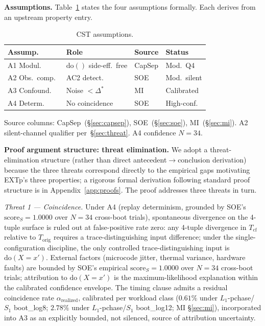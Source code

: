 \documentclass[conference]{IEEEtran}
\newcommand{\Korig}{T_\text{orig}}
\newcommand{\Tcf}{T_\text{cf}}
\newcommand{\Dstar}{\Delta^{*}}
\newcommand{\arealized}{\alpha_\text{realized}}
\newcommand{\scoreS}{\text{score}_S}
\newcommand{\dox}[1]{\text{do}(X{=}#1)}
\begin{document}
\textbf{Assumptions.} Table~\ref{tab:assumptions} states the four
assumptions formally. Each derives from an upstream property entry.

\begin{table}[t]
  \caption{CST assumptions.}
  \label{tab:assumptions}
  \centering
  \small
  \begin{tabular}{@{}p{}p{}p{}p{}@{}}
  \toprule
  Assump.\ & Role & Source & Status \\
  \midrule
  A1 Modul.\           & $\text{do}()$ side-eff.\ free & CapSep
                       & Mod.\ Q4 \\
  A2 Obs.\ comp.\      & AC2 detect.                   & SOE
                       & Mod.\ silent \\
  A3 Confound.\        & Noise $<\Dstar$               & MI
                       & Calibrated \\
  A4 Determ.\          & No coincidence                & SOE
                       & High-conf. \\
  \bottomrule
  \end{tabular}

  \vspace{0.3em}
  \footnotesize{Source columns: CapSep~(\S\ref{sec:capsep}),
  SOE~(\S\ref{sec:soe}), MI~(\S\ref{sec:mi}). A2 silent-channel
  qualifier per~\S\ref{sec:threat}. A4 confidence $N{=}34$.}
\end{table}

\textbf{Proof argument structure: threat elimination.} We adopt a
threat-elimination structure (rather than direct
antecedent$\rightarrow$conclusion derivation) because the three
threats correspond directly to the empirical gaps motivating EXTp's
three properties; a rigorous formal derivation following standard
proof structure is in Appendix~\ref{app:proofs}. The proof addresses
three threats in turn.

\emph{Threat 1 --- Coincidence.} Under A4 (replay determinism,
grounded by SOE's $\scoreS = 1.0000$ over $N{=}34$ cross-boot
trials), spontaneous divergence on the 4-tuple surface is ruled out
at false-positive rate zero: any 4-tuple divergence in $\Tcf$
relative to $\Korig$ requires a trace-distinguishing input
difference; under the single-configuration discipline, the only
controlled trace-distinguishing input is $\dox{x'}$. External
factors (microcode jitter, thermal variance, hardware faults) are
bounded by SOE's empirical $\scoreS = 1.0000$ over $N{=}34$
cross-boot trials; attribution to $\dox{x'}$ is the
maximum-likelihood explanation within the calibrated confidence
envelope. The timing clause admits a residual coincidence rate
$\arealized$, calibrated per workload class ($0.61\%$ under
$L_1$-pchase/$S_1$ boot\_log8; $2.78\%$ under $L_1$-pchase/$S_1$
boot\_log12; MI \S\ref{sec:mi}), incorporated into A3 as an
explicitly bounded, not silenced, source of attribution uncertainty.
\end{document}
